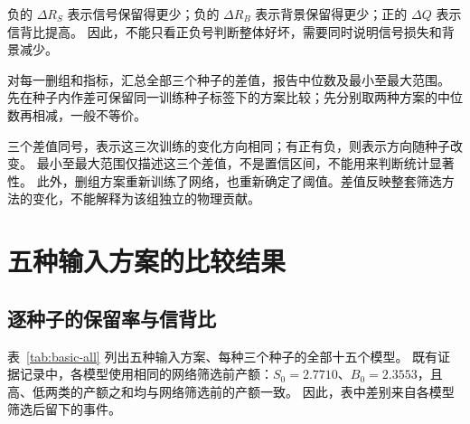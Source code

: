 \documentclass[11pt,a4paper,fontset=fandol,scheme=plain]{ctexart}
\begin{document}
负的 $\Delta R_S$ 表示信号保留得更少；负的 $\Delta R_B$ 表示背景保留得更少；正的 $\Delta Q$ 表示信背比提高。
因此，不能只看正负号判断整体好坏，需要同时说明信号损失和背景减少。

对每一删组和指标，汇总全部三个种子的差值，报告中位数及最小至最大范围。
先在种子内作差可保留同一训练种子标签下的方案比较；先分别取两种方案的中位数再相减，一般不等价。

三个差值同号，表示这三次训练的变化方向相同；有正有负，则表示方向随种子改变。
最小至最大范围仅描述这三个差值，不是置信区间，不能用来判断统计显著性。
此外，删组方案重新训练了网络，也重新确定了阈值。差值反映整套筛选方法的变化，不能解释为该组独立的物理贡献。


\FloatBarrier
{}
\section{五种输入方案的比较结果}\label{sec:results}

\subsection{逐种子的保留率与信背比}
表~\ref{tab:basic-all} 列出五种输入方案、每种三个种子的全部十五个模型。
既有证据记录中，各模型使用相同的网络筛选前产额：$S_0=2.7710$、$B_0=2.3553$，且高、低两类的产额之和均与网络筛选前的产额一致。
因此，表中差别来自各模型筛选后留下的事件。
\end{document}
